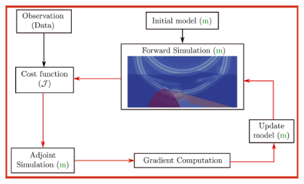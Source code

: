 \begin{frame}[noframenumbering]
\begin{figure}
  \includegraphics[scale=0.31]{image/fwi_workflow_all.pdf}
\end{figure}
\end{frame}












